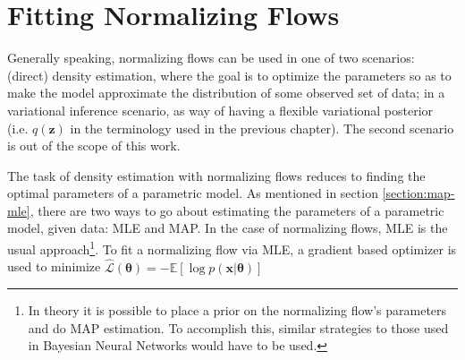 \section{Fitting Normalizing Flows}

Generally speaking, normalizing flows can be used in one of two scenarios:
(direct) density estimation, where the goal is to optimize the parameters
so as to make the model approximate the distribution of some observed set of data;
in a variational inference scenario, as way of having a flexible variational
posterior (i.e. $q(\bm{z})$ in the terminology used in the previous chapter). The
second scenario is out of the scope of this work.

The task of density estimation with normalizing flows reduces to finding the
optimal parameters of a parametric model. As mentioned in section \ref{section:map-mle},
there are two ways to go about estimating the parameters of a parametric model,
given data: MLE and MAP. In the case of normalizing flows, MLE is the usual
approach\footnote{In theory it is possible to place a prior on the normalizing
flow's parameters and do MAP estimation. To accomplish this, similar strategies
to those used in Bayesian Neural Networks would have to be used.}. To fit a normalizing
flow via MLE, a gradient based optimizer is used to minimize
$\hat{\mathcal{L}}(\bm\theta) = - \mathbb{E}[\log p(\bm{x}|\bm\theta)]$
